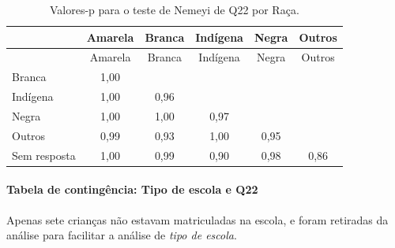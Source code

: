 \documentclass[]{article}
\let\oldparagraph\paragraph
\renewcommand{\paragraph}[1]{\oldparagraph{#1}\mbox{}}
\begin{document}
\begin{longtable}[]{@{}lccccc@{}}
\caption{\label{tab:unnamed-chunk-523}Valores-p para o teste de Nemeyi de Q22 por Raça.}\tabularnewline
\toprule
& Amarela & Branca & Indígena & Negra & Outros\tabularnewline
\midrule
\endfirsthead
\toprule
& Amarela & Branca & Indígena & Negra & Outros\tabularnewline
\midrule
\endhead
Branca & 1,00 & & & &\tabularnewline
Indígena & 1,00 & 0,96 & & &\tabularnewline
Negra & 1,00 & 1,00 & 0,97 & &\tabularnewline
Outros & 0,99 & 0,93 & 1,00 & 0,95 &\tabularnewline
Sem resposta & 1,00 & 0,99 & 0,90 & 0,98 & 0,86\tabularnewline
\bottomrule
\end{longtable}

\cleardoublepage

\hypertarget{tabela-de-continguxeancia-tipo-de-escola-e-q22}{%
\paragraph{Tabela de contingência: Tipo de escola e Q22}\label{tabela-de-continguxeancia-tipo-de-escola-e-q22}}

Apenas sete crianças não estavam matriculadas na escola, e foram retiradas da análise para facilitar a análise de \emph{tipo de escola}.
\end{document}
